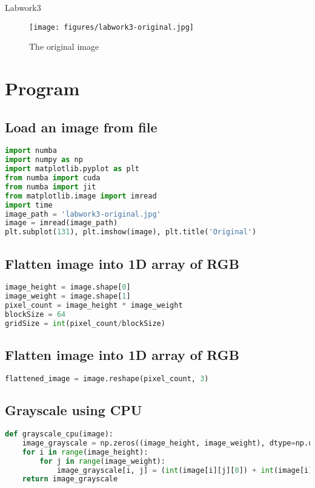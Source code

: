\documentclass[12pt]{article}
\begin{document}
\begin{center}
    \vspace*{1.8cm}
    \Large
    Labwork3\\
\end{center}


\begin{figure}[H]
\centering
    \texttt{[image: figures/labwork3-original.jpg]}
    \caption{The original image}
\end{figure}
\section{Program}
\subsection{Load an image from file}
\begin{lstlisting}[language=Python]
import numba
import numpy as np
import matplotlib.pyplot as plt
from numba import cuda
from numba import jit
from matplotlib.image import imread
import time
image_path = 'labwork3-original.jpg'
image = imread(image_path)
plt.subplot(131), plt.imshow(image), plt.title('Original')
\end{lstlisting}
\subsection{Flatten image into 1D array of RGB}
\begin{lstlisting}[language=Python]
image_height = image.shape[0]
image_weight = image.shape[1]
pixel_count = image_height * image_weight
blockSize = 64
gridSize = int(pixel_count/blockSize)
\end{lstlisting}
\subsection{Flatten image into 1D array of RGB}
\begin{lstlisting}[language=Python]
flattened_image = image.reshape(pixel_count, 3)
\end{lstlisting}
\subsection{Grayscale using CPU}
\begin{lstlisting}[language=Python]
def grayscale_cpu(image):
    image_grayscale = np.zeros((image_height, image_weight), dtype=np.uint8)
    for i in range(image_height):
        for j in range(image_weight):
            image_grayscale[i, j] = (int(image[i][j][0]) + int(image[i][j][1]) + int(image[i][j][2])) /3
    return image_grayscale
\end{lstlisting}
\end{document}
